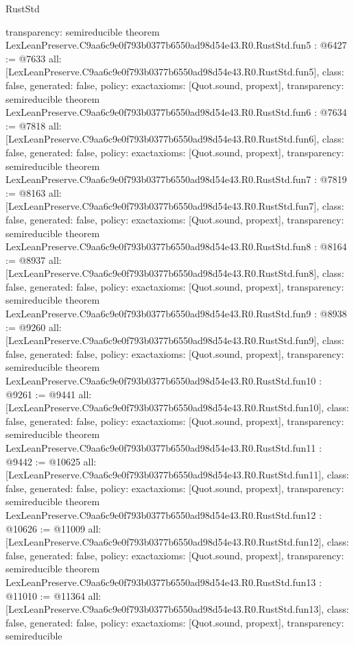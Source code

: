 \begin{lexlean}{RustStd}
\begin{coremodule}
{  transparency: semireducible
}
theorem LexLeanPreserve.C9aa6c9e0f793b0377b6550ad98d54e43.R0.RustStd.fun5 : @6427 := @7633 {
  all: [LexLeanPreserve.C9aa6c9e0f793b0377b6550ad98d54e43.R0.RustStd.fun5],
  class: false,
  generated: false,
  policy: exact{axioms: [Quot.sound, propext]},
  transparency: semireducible
}
theorem LexLeanPreserve.C9aa6c9e0f793b0377b6550ad98d54e43.R0.RustStd.fun6 : @7634 := @7818 {
  all: [LexLeanPreserve.C9aa6c9e0f793b0377b6550ad98d54e43.R0.RustStd.fun6],
  class: false,
  generated: false,
  policy: exact{axioms: [Quot.sound, propext]},
  transparency: semireducible
}
theorem LexLeanPreserve.C9aa6c9e0f793b0377b6550ad98d54e43.R0.RustStd.fun7 : @7819 := @8163 {
  all: [LexLeanPreserve.C9aa6c9e0f793b0377b6550ad98d54e43.R0.RustStd.fun7],
  class: false,
  generated: false,
  policy: exact{axioms: [Quot.sound, propext]},
  transparency: semireducible
}
theorem LexLeanPreserve.C9aa6c9e0f793b0377b6550ad98d54e43.R0.RustStd.fun8 : @8164 := @8937 {
  all: [LexLeanPreserve.C9aa6c9e0f793b0377b6550ad98d54e43.R0.RustStd.fun8],
  class: false,
  generated: false,
  policy: exact{axioms: [Quot.sound, propext]},
  transparency: semireducible
}
theorem LexLeanPreserve.C9aa6c9e0f793b0377b6550ad98d54e43.R0.RustStd.fun9 : @8938 := @9260 {
  all: [LexLeanPreserve.C9aa6c9e0f793b0377b6550ad98d54e43.R0.RustStd.fun9],
  class: false,
  generated: false,
  policy: exact{axioms: [Quot.sound, propext]},
  transparency: semireducible
}
theorem LexLeanPreserve.C9aa6c9e0f793b0377b6550ad98d54e43.R0.RustStd.fun10 : @9261 := @9441 {
  all: [LexLeanPreserve.C9aa6c9e0f793b0377b6550ad98d54e43.R0.RustStd.fun10],
  class: false,
  generated: false,
  policy: exact{axioms: [Quot.sound, propext]},
  transparency: semireducible
}
theorem LexLeanPreserve.C9aa6c9e0f793b0377b6550ad98d54e43.R0.RustStd.fun11 : @9442 := @10625 {
  all: [LexLeanPreserve.C9aa6c9e0f793b0377b6550ad98d54e43.R0.RustStd.fun11],
  class: false,
  generated: false,
  policy: exact{axioms: [Quot.sound, propext]},
  transparency: semireducible
}
theorem LexLeanPreserve.C9aa6c9e0f793b0377b6550ad98d54e43.R0.RustStd.fun12 : @10626 := @11009 {
  all: [LexLeanPreserve.C9aa6c9e0f793b0377b6550ad98d54e43.R0.RustStd.fun12],
  class: false,
  generated: false,
  policy: exact{axioms: [Quot.sound, propext]},
  transparency: semireducible
}
theorem LexLeanPreserve.C9aa6c9e0f793b0377b6550ad98d54e43.R0.RustStd.fun13 : @11010 := @11364 {
  all: [LexLeanPreserve.C9aa6c9e0f793b0377b6550ad98d54e43.R0.RustStd.fun13],
  class: false,
  generated: false,
  policy: exact{axioms: [Quot.sound, propext]},
  transparency: semireducible
}
\end{coremodule}
\end{lexlean}
